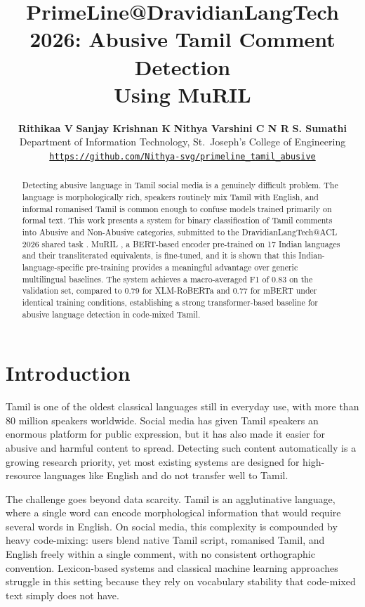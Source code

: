 \documentclass[11pt]{article}
\title{PrimeLine@DravidianLangTech 2026: Abusive Tamil Comment Detection\\
Using MuRIL}
\author{
  \textbf{Rithikaa V} \quad \textbf{Sanjay Krishnan K} \quad \textbf{Nithya Varshini C N R} \quad \textbf{S. Sumathi}\\
  Department of Information Technology, St.\ Joseph's College of Engineering\\
  \href{https://github.com/Nithya-svg/primeline_tamil_abusive}{\texttt{https://github.com/Nithya-svg/primeline\_tamil\_abusive}}
}
\begin{document}
\maketitle

\begin{abstract}
Detecting abusive language in Tamil social media is a genuinely difficult problem. The language is morphologically rich, speakers routinely mix Tamil with English, and informal
romanised Tamil is common enough to confuse models trained primarily on formal text.
This work presents a system for binary classification of Tamil comments into Abusive and
Non-Abusive categories, submitted to the DravidianLangTech@ACL 2026 shared task \cite{sivagnanam2026}.
MuRIL \cite{khanuja2021}, a BERT-based encoder pre-trained
on 17 Indian languages and their transliterated equivalents, is fine-tuned, and it is shown
that this Indian-language-specific pre-training
provides a meaningful advantage over generic
multilingual baselines. The system achieves a
macro-averaged F1 of 0.83 on the validation
set, compared to 0.79 for XLM-RoBERTa and
0.77 for mBERT under identical training conditions, establishing a strong transformer-based
baseline for abusive language detection in code-mixed Tamil.
\end{abstract}

\section{Introduction}

Tamil is one of the oldest classical languages still in
everyday use, with more than 80 million speakers
worldwide. Social media has given Tamil speakers
an enormous platform for public expression, but
it has also made it easier for abusive and harmful
content to spread. Detecting such content automatically is a growing research priority, yet most
existing systems are designed for high-resource
languages like English and do not transfer well to
Tamil.

The challenge goes beyond data scarcity. Tamil
is an agglutinative language, where a single word
can encode morphological information that would
require several words in English. On social media, this complexity is compounded by heavy code-mixing: users blend native Tamil script, romanised Tamil, and English freely within a single comment, with no consistent orthographic convention.
Lexicon-based systems and classical machine learning approaches struggle in this setting because they
rely on vocabulary stability that code-mixed text
simply does not have.
\end{document}
